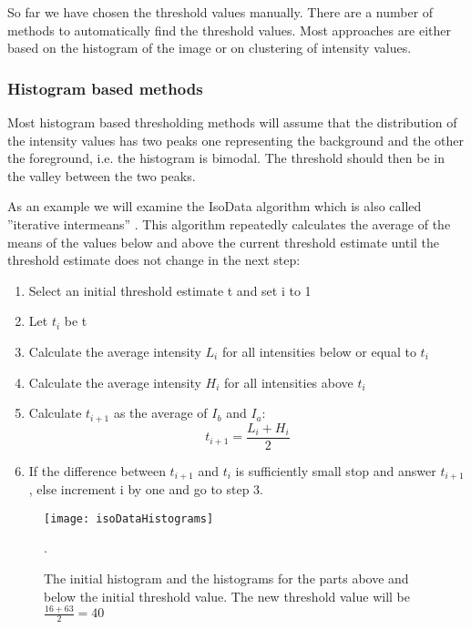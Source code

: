 So far we have chosen the threshold values manually. There are a number of methods to automatically find the threshold values. Most approaches are either based on the histogram of the image or on clustering of intensity values.

\subsubsection{Histogram based methods}

Most histogram based thresholding methods will assume that the distribution of the intensity values has two peaks one representing the background and the other the foreground, i.e. the histogram is bimodal. The threshold should then be in the valley between the two peaks.

As an example we will examine the IsoData algorithm which is also called ''iterative intermeans'' \cite{ridler_picture_1978}. This algorithm repeatedly calculates the average of the means of the values below and above the current threshold estimate until the threshold estimate does not change in the next step:

\begin{enumerate}
\item Select an initial threshold estimate t and set i to 1
\item Let $t_{i}$ be t
\item Calculate the average intensity $L_{i}$ for all intensities below or equal to $t_{i}$
\item Calculate the average intensity $H_{i}$ for all intensities above $t_{i}$
\item Calculate $t_{i+1}$ as the average of $I_{b}$ and $I_{a}$:
\begin{equation}
t_{i+1} = \frac{L_{i} + H_{i}}{2}
\end{equation}
\item If the difference between $t_{i+1}$ and $t_{i}$ is sufficiently small stop and answer $t_{i+1}$, else increment i by one and go to step 3.
\end{enumerate}

\begin{figure}[h!]
  \centering
\texttt{[image: isoDataHistograms]}
    \caption[isoData-histograms]{The initial histogram and the histograms for the parts above and below the initial threshold value. The new threshold value will be $\frac{16+63}{2} = 40$}.
    \label{isoData-histogram}
\end{figure}

